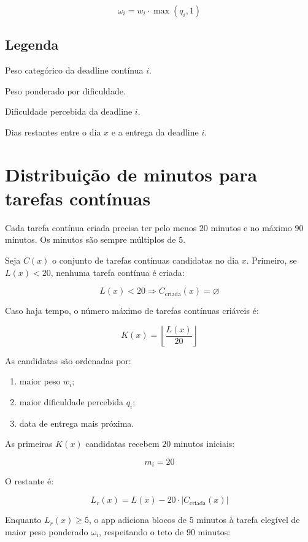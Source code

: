 \documentclass[12pt,a4paper]{article}
\begin{document}
\[
\omega_i = w_i \cdot \max(q_i, 1)
\]

\subsection*{Legenda}

\begin{description}[leftmargin=2.2cm]
    \item[$w_i$] Peso categórico da deadline contínua $i$.
    \item[$\omega_i$] Peso ponderado por dificuldade.
    \item[$q_i$] Dificuldade percebida da deadline $i$.
    \item[$\Delta_i(x)$] Dias restantes entre o dia $x$ e a entrega da deadline $i$.
\end{description}

\section{Distribuição de minutos para tarefas contínuas}

Cada tarefa contínua criada precisa ter pelo menos $20$ minutos e no máximo $90$ minutos. Os minutos são sempre múltiplos de $5$.

Seja $C(x)$ o conjunto de tarefas contínuas candidatas no dia $x$. Primeiro, se $L(x) < 20$, nenhuma tarefa contínua é criada:

\[
L(x) < 20 \Rightarrow C_{\text{criada}}(x) = \varnothing
\]

Caso haja tempo, o número máximo de tarefas contínuas criáveis é:

\[
K(x) =
\left\lfloor
\frac{L(x)}{20}
\right\rfloor
\]

As candidatas são ordenadas por:

\begin{enumerate}
    \item maior peso $w_i$;
    \item maior dificuldade percebida $q_i$;
    \item data de entrega mais próxima.
\end{enumerate}

As primeiras $K(x)$ candidatas recebem $20$ minutos iniciais:

\[
m_i = 20
\]

O restante é:

\[
L_r(x) = L(x) - 20 \cdot |C_{\text{criada}}(x)|
\]

Enquanto $L_r(x) \geq 5$, o app adiciona blocos de $5$ minutos à tarefa elegível de maior peso ponderado $\omega_i$, respeitando o teto de $90$ minutos:
\end{document}
